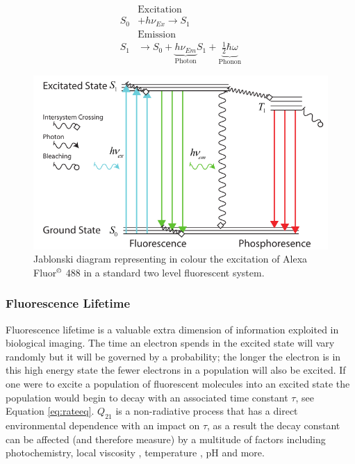 \begin{align}
&\text{Excitation}\nonumber\\
S_0 &+ h \nu_{Ex} \rightarrow S_1 \label{eq:excitation}\\
&\text{Emission}\nonumber\\
S_1 &\rightarrow S_0 + \underbrace{h \nu_{Em}}_{\text{Photon}}  S_1 + \underbrace{\frac{1}{2} \hbar \omega}_{\text{Phonon}} \label{eq:emission}
\end{align}

\begin{figure}
\centering
\includegraphics[width=0.7\linewidth]{jablonski_triplet}
\caption[Standard jablonski diagram]{Jablonski diagram representing in colour the excitation of Alexa Fluor$^{\copyright}$ 488 in a standard two level fluorescent system.}
\label{fig:jablonski}
\end{figure}




\subsubsection{Fluorescence Lifetime}\label{sec:lifetime}

Fluorescence lifetime is a valuable extra dimension of information exploited in biological imaging. The time an electron spends in the excited state will vary randomly but it will be governed by a probability; the longer the electron is in this high energy state the fewer electrons in a population will also be excited. If one were to excite a population of fluorescent molecules into an excited state the population would begin to decay with an associated time constant $\tau$, see Equation \eqref{eq:rateeq}. $Q_{21}$ is a non-radiative process that has a direct environmental dependence with an impact on $\tau$, as a result the decay constant can be affected (and therefore measure) by a multitude of factors including photochemistry, local viscosity \cite{Suhling2012}, temperature \cite{Schaerli2009}, pH and more.

